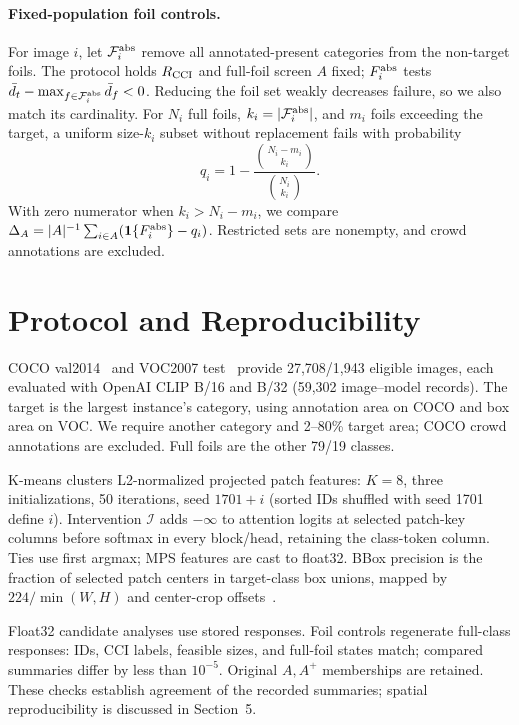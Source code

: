 \documentclass[10pt]{article}
\newcommand{\foils}{\mathcal F}
\begin{document}
\paragraph{Fixed-population foil controls.}
For image $i$, let $\foils_i^{\rm abs}$ remove all annotated-present categories
from the non-target foils. The protocol holds $R_{\rm CCI}$ and full-foil screen $A$ fixed;
$F_i^{\rm abs}$ tests $\bar d_t-\max_{f\in\foils_i^{\rm abs}}\bar d_f<0$.
Reducing the foil set weakly decreases failure, so we also match its cardinality. For $N_i$ full
foils, $k_i=|\foils_i^{\rm abs}|$, and $m_i$ foils exceeding the target,
a uniform size-$k_i$ subset without replacement fails with probability
\begin{equation}
q_i=1-\frac{\binom{N_i-m_i}{k_i}}{\binom{N_i}{k_i}}.
\label{eq:matched}
\end{equation}
With zero numerator when $k_i>N_i-m_i$, we compare
$\Delta_A=|A|^{-1}\sum_{i\in A}(\mathbf1\{F_i^{\rm abs}\}-q_i)$.
Restricted sets are nonempty, and crowd annotations are excluded.

\section{Protocol and Reproducibility}
COCO val2014~\cite{lin2014coco} and VOC2007 test~\cite{everingham2010voc}
provide 27,708/1,943 eligible images, each evaluated with OpenAI CLIP B/16
and B/32 (59,302 image--model records). The target is the largest instance's
category, using annotation area on COCO and box area on VOC. We require
another category and 2--80\% target area; COCO crowd annotations are excluded.
Full foils are the other 79/19 classes.

K-means clusters L2-normalized projected patch features: $K=8$, three
initializations, 50 iterations, seed $1701+i$ (sorted IDs shuffled with seed
1701 define $i$). Intervention $\mathcal I$
adds $-\infty$ to attention logits at selected patch-key columns before
softmax in every block/head, retaining the class-token column. Ties use first argmax; MPS features are cast to float32.
BBox precision is the fraction of selected patch centers in target-class box unions,
mapped by $224/\min(W,H)$ and center-crop offsets~\cite{gomez2022metrics}.

Float32 candidate analyses use stored responses. Foil controls regenerate
full-class responses: IDs, CCI labels, feasible sizes, and full-foil states
match; compared summaries differ by less than $10^{-5}$. Original $A,A^+$ memberships are retained. These checks establish
agreement of the recorded summaries; spatial reproducibility is discussed
in Section~5.
\end{document}
